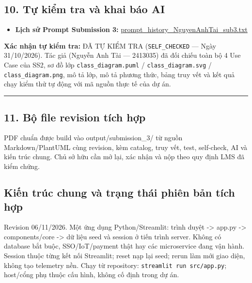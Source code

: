 \documentclass[11pt,a4paper]{article}
\providecommand{\tightlist}{%
  \setlength{\itemsep}{0pt}\setlength{\parskip}{0pt}}
\begin{document}
\hypertarget{tux1ef1-kiux1ec3m-tra-vuxe0-khai-buxe1o-ai}{%
\subsection{10. Tự kiểm tra và khai báo
AI}\label{tux1ef1-kiux1ec3m-tra-vuxe0-khai-buxe1o-ai}}

\begin{itemize}
\tightlist
\item
  \textbf{Lịch sử Prompt Submission 3:}
  \href{../../../prompt-history/TV2_NguyenAnhTai/prompt_history_NguyenAnhTai_sub3.txt}{prompt\_history\_NguyenAnhTai\_sub3.txt}
\end{itemize}

\textbf{Xác nhận tự kiểm tra:} ĐÃ TỰ KIỂM TRA (\texttt{SELF\_CHECKED}
--- Ngày 31/10/2026). Tác giả (Nguyễn Anh Tài --- 2413035) đã đối chiếu
toàn bộ 4 Use Case của SS2, sơ đồ lớp \texttt{class\_diagram.puml} /
\texttt{class\_diagram.svg} / \texttt{class\_diagram.png}, mô tả lớp, mô
tả phương thức, bảng truy vết và kết quả chạy kiểm thử tự động với mã
nguồn thực tế của dự án.

\begin{center}\rule{0.5\linewidth}{0.5pt}\end{center}

\hypertarget{bux1ed9-file-revision-tuxedch-hux1ee3p}{%
\subsection{11. Bộ file revision tích
hợp}\label{bux1ed9-file-revision-tuxedch-hux1ee3p}}

PDF chuẩn được build vào output/submission\_3/ từ nguồn
Markdown/PlantUML cùng revision, kèm catalog, truy vết, test,
self-check, AI và kiến trúc chung. Chủ sở hữu cần mở lại, xác nhận và
nộp theo quy định LMS đã kiểm chứng.

\hypertarget{kiux1ebfn-truxfac-chung-vuxe0-trux1ea1ng-thuxe1i-phiuxean-bux1ea3n-tuxedch-hux1ee3p}{%
\subsection{Kiến trúc chung và trạng thái phiên bản tích
hợp}\label{kiux1ebfn-truxfac-chung-vuxe0-trux1ea1ng-thuxe1i-phiuxean-bux1ea3n-tuxedch-hux1ee3p}}

Revision 06/11/2026. Một ứng dụng Python/Streamlit: trình duyệt
-\textgreater{} app.py -\textgreater{} components/core -\textgreater{}
dữ liệu seed và session ở tiến trình server. Không có database bắt buộc,
SSO/IoT/payment thật hay các microservice đang vận hành. Session thuộc
từng kết nối Streamlit; reset nạp lại seed; rerun làm mới giao diện,
không tạo telemetry nền. Chạy từ repository:
\texttt{streamlit\ run\ src/app.py}; host/cổng phụ thuộc cấu hình, không
cố định trong dự án.
\end{document}
